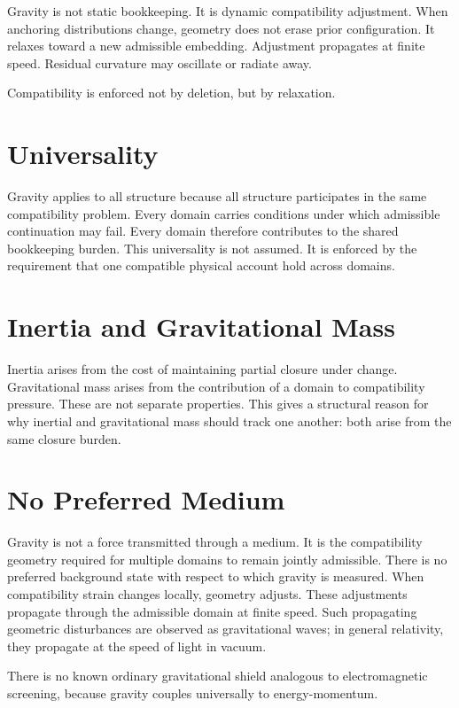 \documentclass[11pt,twoside,openright]{book}
\begin{document}
Gravity is not static bookkeeping. It is dynamic compatibility adjustment. When anchoring distributions change, geometry does not erase prior configuration. It relaxes toward a new admissible embedding. Adjustment propagates at finite speed. Residual curvature may oscillate or radiate away.

Compatibility is enforced not by deletion, but by relaxation.

\section*{Universality}

Gravity applies to all structure because all structure participates in the same compatibility problem. Every domain carries conditions under which admissible continuation may fail. Every domain therefore contributes to the shared bookkeeping burden. This universality is not assumed. It is enforced by the requirement that one compatible physical account hold across domains.

\section*{Inertia and Gravitational Mass}

Inertia arises from the cost of maintaining partial closure under change. Gravitational mass arises from the contribution of a domain to compatibility pressure. These are not separate properties. This gives a structural reason for why inertial and gravitational mass should track one another: both arise from the same closure burden.

\section*{No Preferred Medium}

Gravity is not a force transmitted through a medium. It is the compatibility geometry required for multiple domains to remain jointly admissible. There is no preferred background state with respect to which gravity is measured. When compatibility strain changes locally, geometry adjusts. These adjustments propagate through the admissible domain at finite speed. Such propagating geometric disturbances are observed as gravitational waves; in general relativity, they propagate at the speed of light in vacuum.

There is no known ordinary gravitational shield analogous to electromagnetic screening, because gravity couples universally to energy-momentum.
\end{document}
